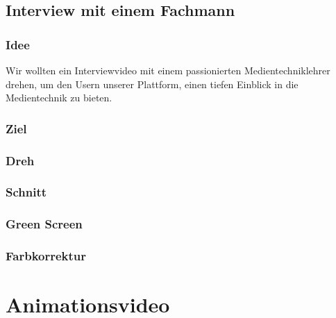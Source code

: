 \section{Interview mit einem Fachmann}
\subsection{Idee}
Wir wollten ein Interviewvideo mit einem passionierten Medientechniklehrer drehen, um den Usern unserer Plattform, einen tiefen Einblick in die Medientechnik zu bieten.

\subsection{Ziel}

\subsection{Dreh}

\subsection{Schnitt}

\subsection{Green Screen}

\subsection{Farbkorrektur}



\chapter{Animationsvideo}

